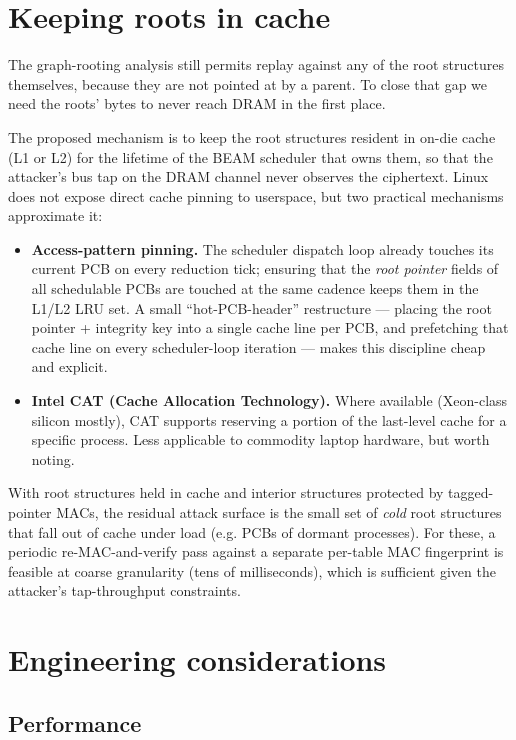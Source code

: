 \documentclass[10pt,a4paper]{article}
\begin{document}
\section{Keeping roots in cache}

The graph-rooting analysis still permits replay against any of the
root structures themselves, because they are not pointed at by a
parent. To close that gap we need the roots' bytes to never reach
DRAM in the first place.

The proposed mechanism is to keep the root structures resident in
on-die cache (L1 or L2) for the lifetime of the BEAM scheduler that
owns them, so that the attacker's bus tap on the DRAM channel never
observes the ciphertext. Linux does not expose direct cache pinning
to userspace, but two practical mechanisms approximate it:

\begin{itemize}[label=---]
\item \textbf{Access-pattern pinning.} The scheduler dispatch loop
already touches its current PCB on every reduction tick; ensuring that
the \emph{root pointer} fields of all schedulable PCBs are touched at
the same cadence keeps them in the L1/L2 LRU set. A small
``hot-PCB-header'' restructure --- placing the root pointer + integrity
key into a single cache line per PCB, and prefetching that cache line
on every scheduler-loop iteration --- makes this discipline cheap and
explicit.
\item \textbf{Intel CAT (Cache Allocation Technology).} Where available
(Xeon-class silicon mostly), CAT supports reserving a portion of the
last-level cache for a specific process. Less applicable to commodity
laptop hardware, but worth noting.
\end{itemize}

With root structures held in cache and interior structures protected by
tagged-pointer MACs, the residual attack surface is the small set of
\emph{cold} root structures that fall out of cache under load (e.g. PCBs
of dormant processes). For these, a periodic re-MAC-and-verify pass
against a separate per-table MAC fingerprint is feasible at coarse
granularity (tens of milliseconds), which is sufficient given the
attacker's tap-throughput constraints.

\section{Engineering considerations}

\subsection{Performance}
\end{document}
